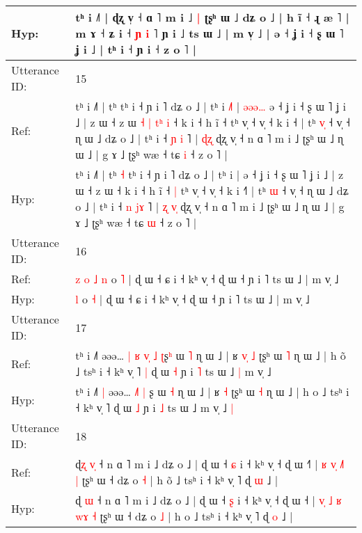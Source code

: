 \documentclass[10pt]{article}
\DeclareRobustCommand{\hl}[1]{{\textcolor{red}{#1}}}
\begin{document}
\begin{longtable}{ll}
 \\
Hyp: & tʰ i ˩˥ | ɖʐ v̩ ˧\hl{}\hl{} ɑ ˥ m i ˩\hl{ }\hl{|} ʈʂʰ ɯ ˩ dʑ o ˩ | h ĩ ˧ ɻ æ ˥ | m ɤ ˧ ʑ i ˧ \hl{ɲ} \hl{}\hl{i} ˥ ɲ i ˩ ts ɯ ˩ | m v̩ ˩ | ə ˧ ʝ i ˧ ʂ ɯ ˥ ʝ i ˩ | tʰ i ˧ ɲ i ˧ z o ˥ |
 \\
\midrule
Utterance ID: & 15 \\
Ref: & tʰ i ˩˥ | tʰ\hl{}\hl{} tʰ i ˧ ɲ i ˥ dʑ o ˩ | tʰ i\hl{ }\hl{˩}\hl{˥} |\hl{ }\hl{ə}\hl{ə}\hl{ə}\hl{…} ə ˧ ʝ i ˧ ʂ ɯ ˥ ʝ i ˩ | z ɯ ˧ z ɯ\hl{ }\hl{˧}\hl{ }\hl{|}\hl{ }\hl{t}\hl{ʰ}\hl{ }\hl{i} ˧ k i ˧ h ĩ ˧\hl{}\hl{} tʰ v̩ ˧ v̩ ˧ k i ˧\hl{} | tʰ \hl{v}\hl{̩} ˧ v̩ ˧ ɳ ɯ ˩ dʑ o ˩ | tʰ i ˧ \hl{ɲ} \hl{}\hl{i} ˥ |\hl{}\hl{} \hl{ɖ}\hl{ʐ} ɖʐ v̩ ˧ n ɑ ˥ m i ˩ ʈʂʰ ɯ ˩ ɳ ɯ ˩ | g ɤ ˩ ʈʂʰ wæ ˧ tɕ \hl{i} ˧ z o ˥ |
 \\
Hyp: & tʰ i ˩˥ | tʰ\hl{ }\hl{˧} tʰ i ˧ ɲ i ˥ dʑ o ˩ | tʰ i\hl{}\hl{}\hl{} |\hl{}\hl{}\hl{}\hl{}\hl{} ə ˧ ʝ i ˧ ʂ ɯ ˥ ʝ i ˩ | z ɯ ˧ z ɯ\hl{}\hl{}\hl{}\hl{}\hl{}\hl{}\hl{}\hl{}\hl{} ˧ k i ˧ h ĩ ˧\hl{ }\hl{|} tʰ v̩ ˧ v̩ ˧ k i ˧\hl{˥} | tʰ \hl{}\hl{ɯ} ˧ v̩ ˧ ɳ ɯ ˩ dʑ o ˩ | tʰ i ˧ \hl{n} \hl{j}\hl{ɤ} ˥ |\hl{ }\hl{ʐ} \hl{v}\hl{̩} ɖʐ v̩ ˧ n ɑ ˥ m i ˩ ʈʂʰ ɯ ˩ ɳ ɯ ˩ | g ɤ ˩ ʈʂʰ wæ ˧ tɕ \hl{ɯ} ˧ z o ˥ |
 \\
\midrule
Utterance ID: & 16 \\
Ref: & \hl{z}\hl{ }\hl{o}\hl{ }\hl{˩}\hl{ }\hl{n} o \hl{˥} | ɖ ɯ ˧ ɕ i ˧ kʰ v̩ ˧ ɖ ɯ ˧ ɲ i ˥ ts ɯ ˩ | m v̩ ˩
 \\
Hyp: & \hl{}\hl{}\hl{}\hl{}\hl{}\hl{}\hl{l} o \hl{˧} | ɖ ɯ ˧ ɕ i ˧ kʰ v̩ ˧ ɖ ɯ ˧ ɲ i ˥ ts ɯ ˩ | m v̩ ˩
 \\
\midrule
Utterance ID: & 17 \\
Ref: & tʰ i ˩˥\hl{}\hl{} əəə…\hl{ }\hl{|}\hl{ }\hl{ʁ} \hl{v}\hl{̩} \hl{˩} \hl{ʈ}ʂ\hl{ʰ} ɯ \hl{˥} ɳ ɯ ˩ | ʁ\hl{ }\hl{v}\hl{̩} \hl{˩} ʈʂʰ ɯ \hl{˥} ɳ ɯ ˩ | h o\hl{̃} ˩ tsʰ i ˧ kʰ v̩ ˥\hl{ }\hl{|} ɖ ɯ \hl{˧} ɲ i \hl{˥} ts ɯ ˩\hl{ }\hl{|} m v̩ ˩\hl{}\hl{}
 \\
Hyp: & tʰ i ˩˥\hl{ }\hl{|} əəə…\hl{}\hl{}\hl{}\hl{} \hl{˩}\hl{˥} \hl{|} \hl{}ʂ\hl{} ɯ \hl{˧} ɳ ɯ ˩ | ʁ\hl{}\hl{}\hl{} \hl{˧} ʈʂʰ ɯ \hl{˧} ɳ ɯ ˩ | h o\hl{} ˩ tsʰ i ˧ kʰ v̩ ˥\hl{}\hl{} ɖ ɯ \hl{˩} ɲ i \hl{˩} ts ɯ ˩\hl{}\hl{} m v̩ ˩\hl{ }\hl{|}
 \\
\midrule
Utterance ID: & 18 \\
Ref: & ɖ\hl{ʐ} \hl{v}\hl{̩} ˧ n ɑ ˥ m i ˩ dʑ o ˩ | ɖ ɯ ˧ \hl{ɕ} i ˧ kʰ v̩ ˧ ɖ ɯ ˧\hl{˥} | \hl{}\hl{ʁ} \hl{}\hl{v}\hl{̩} \hl{˩}\hl{˥} \hl{|} ʈʂʰ ɯ ˧ dʑ o \hl{˧} | h o\hl{̃} ˩ tsʰ i ˧ kʰ v̩ ˥ ɖ \hl{ɯ} ˩ |
 \\
Hyp: & ɖ\hl{} \hl{}\hl{ɯ} ˧ n ɑ ˥ m i ˩ dʑ o ˩ | ɖ ɯ ˧ \hl{ʂ} i ˧ kʰ v̩ ˧ ɖ ɯ ˧\hl{} | \hl{v}\hl{̩} \hl{˩}\hl{ }\hl{ʁ} \hl{w}\hl{ɤ} \hl{˧} ʈʂʰ ɯ ˧ dʑ o \hl{˩} | h o\hl{} ˩ tsʰ i ˧ kʰ v̩ ˥ ɖ \hl{o} ˩ |

\end{longtable}
\end{document}
